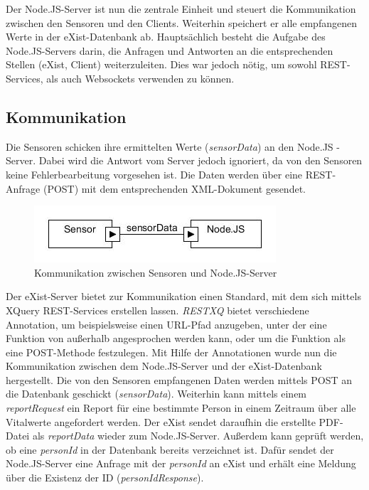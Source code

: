 Der Node.JS-Server ist nun die zentrale Einheit und steuert die Kommunikation zwischen den Sensoren und den Clients. Weiterhin speichert er alle empfangenen Werte in der eXist-Datenbank ab. Hauptsächlich besteht die Aufgabe des Node.JS-Servers darin, die Anfragen und Antworten an die entsprechenden Stellen (eXist, Client) weiterzuleiten. Dies war jedoch nötig, um sowohl REST-Services, als auch Websockets verwenden zu können.

\subsection{Kommunikation}
Die Sensoren schicken ihre ermittelten Werte (\textit{sensorData}) an den Node.JS -Server. Dabei wird die Antwort vom Server jedoch ignoriert, da von den Sensoren keine  Fehlerbearbeitung vorgesehen ist. Die Daten werden über eine REST-Anfrage (POST) mit dem entsprechenden XML-Dokument gesendet.

\begin{figure}[h]
\begin{center}
\includegraphics[scale=0.8]{images/komm1.jpg} 
\caption{Kommunikation zwischen Sensoren und Node.JS-Server}
\end{center}
\end{figure}

Der eXist-Server bietet zur Kommunikation einen Standard, mit dem sich mittels XQuery REST-Services erstellen lassen. \textit{RESTXQ} bietet verschiedene Annotation, um beispielsweise einen URL-Pfad anzugeben, unter der eine Funktion von außerhalb angesprochen werden kann, oder um die Funktion als eine POST-Methode festzulegen. Mit Hilfe der Annotationen wurde nun die Kommunikation zwischen dem Node.JS-Server und der eXist-Datenbank hergestellt. Die von den Sensoren empfangenen Daten werden mittels POST an die Datenbank geschickt (\textit{sensorData}). Weiterhin kann mittels einem \textit{reportRequest} ein Report für eine bestimmte Person in einem Zeitraum über alle Vitalwerte angefordert werden. Der eXist sendet daraufhin die erstellte PDF-Datei als \textit{reportData} wieder zum Node.JS-Server. Außerdem kann geprüft werden, ob eine \textit{personId} in der Datenbank bereits verzeichnet ist. Dafür sendet der Node.JS-Server eine Anfrage mit der \textit{personId} an eXist und erhält eine Meldung über die Existenz der ID (\textit{personIdResponse}).

